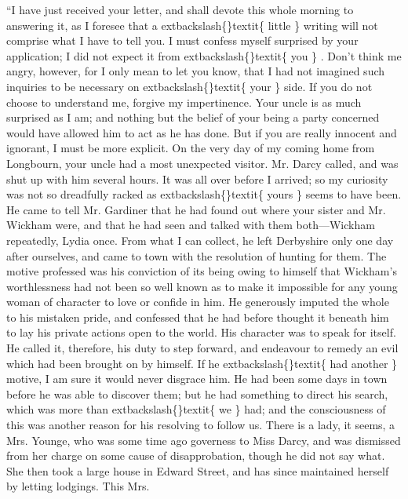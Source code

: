 \documentclass[10pt]{book}
\begin{document}
    “I have just received your letter, and shall devote this whole
morning to answering it, as I foresee that a
    	extbackslash\{\}textit\{
     little
    \}
    writing will
not comprise what I have to tell you. I must confess myself
surprised by your application; I did not expect it from
    	extbackslash\{\}textit\{
     you
    \}
    .
Don’t think me angry, however, for I only mean to let you know,
that I had not imagined such inquiries to be necessary on
    	extbackslash\{\}textit\{
     your
    \}
    side. If you do not choose to understand me, forgive my
impertinence. Your uncle is as much surprised as I am; and nothing
but the belief of your being a party concerned would have allowed
him to act as he has done. But if you are really innocent and
ignorant, I must be more explicit. On the very day of my coming
home from Longbourn, your uncle had a most unexpected visitor. Mr.
Darcy called, and was shut up with him several hours. It was all
over before I arrived; so my curiosity was not so dreadfully racked
as
    	extbackslash\{\}textit\{
     yours
    \}
    seems to have been. He came to tell Mr. Gardiner that he
had found out where your sister and Mr. Wickham were, and that he
had seen and talked with them both—Wickham repeatedly, Lydia once.
From what I can collect, he left Derbyshire only one day after
ourselves, and came to town with the resolution of hunting for
them. The motive professed was his conviction of its being owing to
himself that Wickham’s worthlessness had not been so well known as
to make it impossible for any young woman of character to love or
confide in him. He generously imputed the whole to his mistaken
pride, and confessed that he had before thought it beneath him to
lay his private actions open to
    the world. His character was to
speak for itself. He called it, therefore, his duty to step
forward, and endeavour to remedy an evil which had been brought on
by himself. If he
    	extbackslash\{\}textit\{
     had another
    \}
    motive, I am sure it would never
disgrace him. He had been some days in town before he was able to
discover them; but he had something to direct his search, which was
more than
    	extbackslash\{\}textit\{
     we
    \}
    had; and the consciousness of this was another
reason for his resolving to follow us. There is a lady, it seems, a
Mrs. Younge, who was some time ago governess to Miss Darcy, and was
dismissed from her charge on some cause of disapprobation, though
he did not say what. She then took a large house in Edward Street,
and has since maintained herself by letting lodgings. This Mrs.
\end{document}
